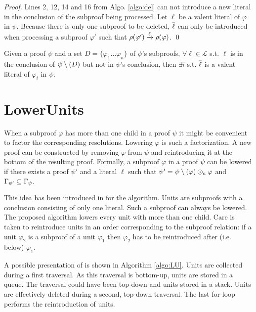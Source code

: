 \documentclass{llncs}
\begin{document}
\newcommand{\pedge}[3]{\ensuremath{\raiz{#1} \xrightarrow{#2} \raiz{#3}}}

\begin{proof}
Lines 2, 12, 14 and 16 from Algo. \ref{algo:del} can not introduce a new literal in the conclusion of
the subproof being processed. Let $\ell$ be a valent literal of $\varphi$ in $\psi$. Because
there is only one subproof to be deleted, $\overline{\ell}$ can only be introduced when processing a
subproof $\varphi'$ such that $\pedge{\varphi'}{\ell}{\varphi}$. \qed
\end{proof}

\begin{proposition}
Given a proof $\psi$ and a set $D = \{\varphi_1 \ldots \varphi_n\}$ of $\psi$'s subproofs, $\forall
\ell \in \mathcal{L}$ s.t. $\ell$ is in the conclusion of $\psi \setminus (D)$ but not in $\psi$'s
conclusion, then $\exists i$ s.t. $\overline{\ell}$ is a valent literal of $\varphi_i$ in $\psi$.
\end{proposition}


\section{LowerUnits} \label{sec:LU}

When a subproof $\varphi$ has more than one child in a proof $\psi$ it might be convenient to factor
the corresponding resolutions. Lowering $\varphi$ is such a factorization. A new proof can be
constructed by removing $\varphi$ from $\psi$ and reintroducing it at the bottom of the resulting
proof. Formally, a subproof $\varphi$ in a proof $\psi$ can be lowered if there exists a proof
$\psi'$ and a literal $\ell$ such that $\psi' = \psi \setminus (\varphi) \odot_a \varphi$ and
$\Gamma_{\psi'} \subseteq \Gamma_{\psi}$.

This idea has been introduced in \cite{LURPI} for the {\LowerUnits} algorithm. Units are subproofs
with a conclusion consisting of only one literal. Such a subproof can always be lowered. The
proposed algorithm lowers every unit with more than one child. Care is taken to reintroduce units in
an order corresponding to the subproof relation: if a unit $\varphi_2$ is a subproof of a unit
$\varphi_1$ then $\varphi_2$ has to be reintroduced after (i.e. below) $\varphi_1$.

A possible presentation of {\LowerUnits} is shown in Algorithm \ref{algo:LU}. Units are collected
during a first traversal. As this traversal is bottom-up, units are stored in a queue. The traversal
could have been top-down and units stored in a stack. Units are effectively deleted during a second,
top-down traversal. The last for-loop performs the reintroduction of units.
\end{document}
